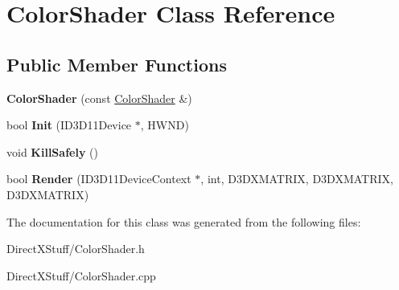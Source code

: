 \hypertarget{class_color_shader}{\section{Color\-Shader Class Reference}
\label{class_color_shader}
}
\subsection*{Public Member Functions}
\begin{DoxyCompactItemize}
\item 
\hypertarget{class_color_shader_ae49453ac383dc59fa599695f96842ed6}{{\bfseries Color\-Shader} (const \hyperlink{class_color_shader}{Color\-Shader} \&)}\label{class_color_shader_ae49453ac383dc59fa599695f96842ed6}

\item 
\hypertarget{class_color_shader_aa9a740744888b23346dab6d91e2411df}{bool {\bfseries Init} (I\-D3\-D11\-Device $\ast$, H\-W\-N\-D)}\label{class_color_shader_aa9a740744888b23346dab6d91e2411df}

\item 
\hypertarget{class_color_shader_a9ae0dfde1e6c69745a0368c58aa81a0f}{void {\bfseries Kill\-Safely} ()}\label{class_color_shader_a9ae0dfde1e6c69745a0368c58aa81a0f}

\item 
\hypertarget{class_color_shader_a6ae7ed7af492c71123aa3851053225bb}{bool {\bfseries Render} (I\-D3\-D11\-Device\-Context $\ast$, int, D3\-D\-X\-M\-A\-T\-R\-I\-X, D3\-D\-X\-M\-A\-T\-R\-I\-X, D3\-D\-X\-M\-A\-T\-R\-I\-X)}\label{class_color_shader_a6ae7ed7af492c71123aa3851053225bb}

\end{DoxyCompactItemize}


The documentation for this class was generated from the following files\-:\begin{DoxyCompactItemize}
\item 
Direct\-X\-Stuff/Color\-Shader.\-h\item 
Direct\-X\-Stuff/Color\-Shader.\-cpp\end{DoxyCompactItemize}
